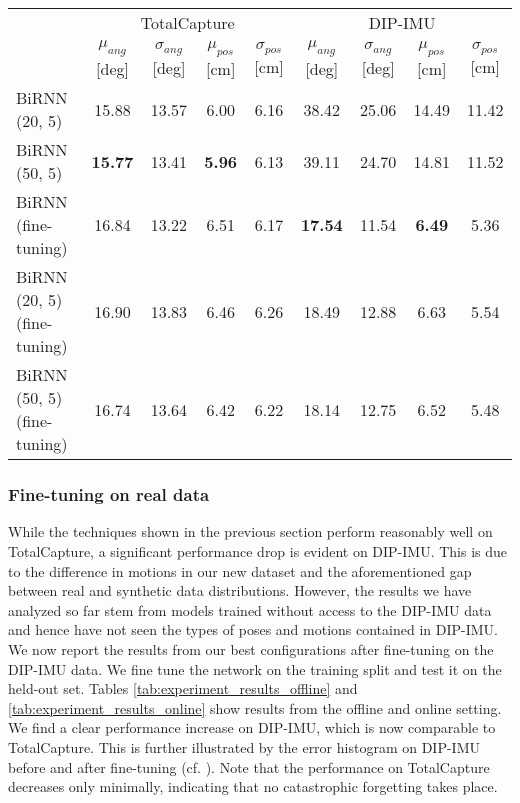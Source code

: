 \documentclass[acmtog]{acmart}
\begin{document}
\begin{table*}[ht]
	\begin{tabular}{l | c c c c | c c c c}
		\hline
        & \multicolumn{4}{c}{TotalCapture} & \multicolumn{4}{|c}{DIP-IMU} \\ 	
		& $\mu_{ang}$[deg] & $\sigma_{ang}$[deg] & $\mu_{pos}$[cm] & $\sigma_{pos}$[cm] & $\mu_{ang}$[deg] & $\sigma_{ang}$[deg] & $\mu_{pos}$[cm] & $\sigma_{pos}$[cm] \\
		\hline
		BiRNN (20, 5) & 15.88 & 13.57 & 6.00 & 6.16 & 38.42 & 25.06 & 14.49 & 11.42\\
		BiRNN (50, 5) & \textbf{15.77} & 13.41 & \textbf{5.96} & 6.13 &  39.11 & 24.70 & 14.81 & 11.52 \\
        BiRNN (fine-tuning) & 16.84 & 13.22 & 6.51 & 6.17 & \textbf{17.54} & 11.54 & \textbf{6.49} & 5.36 \\
        BiRNN (20, 5) (fine-tuning) & 16.90 & 13.83 &  6.46 & 6.26 & 18.49 & 12.88 & 6.63 & 5.54 \\
		BiRNN (50, 5) (fine-tuning) & 16.74 & 13.64 & 6.42 & 6.22 & 18.14 & 12.75 & 6.52 & 5.48 \\
		\hline
	\end{tabular}
    \label{tab:experiment_results_online}
\end{table*}\subsubsection{Fine-tuning on real data}\label{sec:fine_tuning}
While the techniques shown in the previous section perform reasonably well on TotalCapture, a significant performance drop is evident on DIP-IMU. This is due to the difference in motions in our new dataset and the aforementioned gap between real and synthetic data distributions. However, the results we have analyzed so far stem from models trained without access to the DIP-IMU data and hence have not seen the types of poses and motions contained in DIP-IMU. We now report the results from our best configurations after fine-tuning on the DIP-IMU data. We fine tune the network on the training split and test it on the held-out set. Tables \ref{tab:experiment_results_offline} and \ref{tab:experiment_results_online} show results from the offline and online setting. We find a clear performance increase on DIP-IMU, which is now comparable to TotalCapture. This is further illustrated by the error histogram on DIP-IMU before and after fine-tuning (cf. ). Note that the performance on TotalCapture decreases only minimally, indicating that no catastrophic forgetting takes place. 
\end{document}
